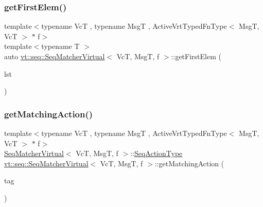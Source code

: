 \mbox{\label{structvt_1_1seq_1_1_seq_matcher_virtual_a50a7258f058e464735eeb23de68c4209}} 
\subsubsection{\texorpdfstring{get\+First\+Elem()}{getFirstElem()}}
{\footnotesize\ttfamily template$<$typename VcT , typename MsgT , Active\+Vrt\+Typed\+Fn\+Type$<$ Msg\+T, Vc\+T $>$ $\ast$ f$>$ \\
template$<$typename T $>$ \\
auto \hyperlink{structvt_1_1seq_1_1_seq_matcher_virtual}{vt\+::seq\+::\+Seq\+Matcher\+Virtual}$<$ VcT, MsgT, f $>$\+::get\+First\+Elem (\begin{DoxyParamCaption}\item[{T \&}]{lst }\end{DoxyParamCaption})\hspace{0.3cm}{\ttfamily [static]}}

\mbox{\label{structvt_1_1seq_1_1_seq_matcher_virtual_a1ddc4f02c3182900d9212cd765c7af87}} 
\subsubsection{\texorpdfstring{get\+Matching\+Action()}{getMatchingAction()}}
{\footnotesize\ttfamily template$<$typename VcT , typename MsgT , Active\+Vrt\+Typed\+Fn\+Type$<$ Msg\+T, Vc\+T $>$ $\ast$ f$>$ \\
\hyperlink{structvt_1_1seq_1_1_seq_matcher_virtual}{Seq\+Matcher\+Virtual}$<$ VcT, MsgT, f $>$\+::\hyperlink{structvt_1_1seq_1_1_seq_matcher_virtual_aa53d05ef480fb78161b56db33018b3b0}{Seq\+Action\+Type} \hyperlink{structvt_1_1seq_1_1_seq_matcher_virtual}{vt\+::seq\+::\+Seq\+Matcher\+Virtual}$<$ VcT, MsgT, f $>$\+::get\+Matching\+Action (\begin{DoxyParamCaption}\item[{\hyperlink{namespacevt_a84ab281dae04a52a4b243d6bf62d0e52}{Tag\+Type} const \&}]{tag }\end{DoxyParamCaption})\hspace{0.3cm}{\ttfamily [static]}}

